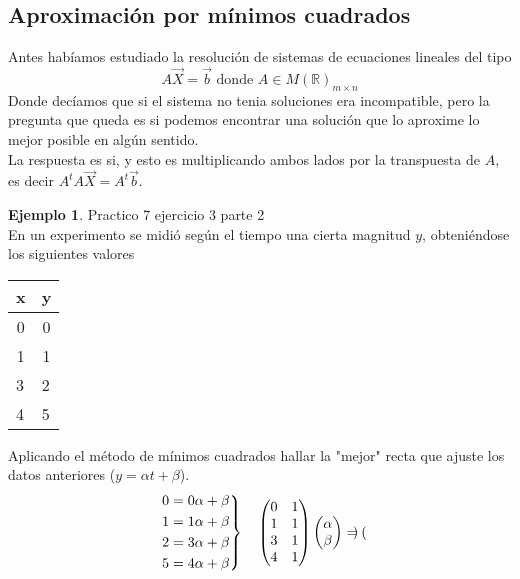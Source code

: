 \documentclass[10pt]{article}
\theoremstyle{definition}
\newtheorem{example}{Ejemplo}[section]
\begin{document}
\subsection{Aproximación por mínimos cuadrados}
Antes habíamos estudiado la resolución de sistemas de ecuaciones lineales del tipo $$A\vec{X}=\vec{b}\text{ donde }A\in M(\mathbb{R})_{m\times n}$$
Donde decíamos que si el sistema no tenia soluciones era incompatible, pero la pregunta que queda es si podemos encontrar una solución que lo aproxime lo mejor posible en algún sentido.
\\La respuesta es si, y esto es multiplicando ambos lados por la transpuesta de $A$, es decir $A^tA\vec{X}=A^t\vec{b}$.
\begin{example}{Practico 7 ejercicio 3 parte 2}
	\\En un experimento se midió según el tiempo una cierta magnitud $y$, obteniéndose los siguientes valores
	\begin{table}[h!]\centering
		\begin{tabular}{|c|c|}
			\hline
			x                       & y                      \\ \hline
			0                       & 0                      \\ \hline
			1                       & 1                      \\ \hline
			\multicolumn{1}{|l|}{3} & \multicolumn{1}{l|}{2} \\ \hline
			\multicolumn{1}{|l|}{4} & \multicolumn{1}{l|}{5} \\ \hline
		\end{tabular}
	\end{table}
	Aplicando el método de mínimos cuadrados hallar la "mejor" recta que ajuste los datos anteriores ($y=\alpha t+\beta$).
	$$\begin{drcases}
			0=0\alpha +\beta \\
			1=1\alpha +\beta \\
			2=3\alpha +\beta \\
			5=4\alpha +\beta
		\end{drcases} \ \ \ \begin{pmatrix}
			0 & 1 \\
			1 & 1 \\
			3 & 1 \\
			4 & 1
		\end{pmatrix}\begin{pmatrix}
			\alpha \\
			\beta
		\end{pmatrix} =\begin{pmatrix}

\end{pmatrix}$$
\end{example}
\end{document}
